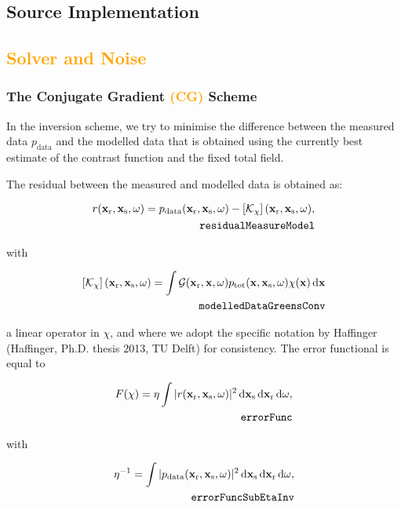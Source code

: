 \documentclass[10pt,a4paper]{article}
\newcommand{\df}[1]{\, \ensuremath{\mbox{d}#1}}
\newcommand{\xs}{\mathbf{x}_\text{s}}
\newcommand{\xr}{\mathbf{x}_\text{r}}
\newcommand{\x}{\mathbf{x}}
\begin{document}
\subsection{Source Implementation}

\subsection{\textcolor{orange}{Solver and Noise}}
\subsubsection{The Conjugate Gradient \textcolor{orange}{(CG)} Scheme}
\label{conjgrad}
In the inversion scheme, we try to minimise the difference between the
measured data $p_\text{data}$ and the modelled data that is obtained
using the currently best estimate of the contrast function and the
fixed total field.

The residual between the measured and modelled data is obtained as:

\begin{align} \label{eq:residualMeasureModel} r(\xr, \xs, \omega) =
p_{\text{data}}(\xr, \xs, \omega) - \left[\mathcal{K}_\chi
\right](\xr, \xs, \omega),\\
\tag*{\texttt{residualMeasureModel}}
\end{align}

with

\begin{align} \label{eq:modelledDataGreensConv} \left[\mathcal{K}_\chi \right](\xr,
\xs, \omega) = \int \mathcal{G}(\xr, \x, \omega) p_\text{tot}(\x, \xs,
\omega) \chi(\x) \df{\x}\\
\tag*{\texttt{modelledDataGreensConv}}
\end{align}

a linear operator in $\chi$, and where we adopt the specific notation
by Haffinger (Haffinger, Ph.D. thesis 2013, TU Delft) for consistency.
The error functional is equal to

\begin{align} \label{eq:errorFunc} F(\chi) = \eta \int |r(\xr, \xs,
\omega)|^2 \df{\mathbf{x}_\text{s}} \df{\xr}
\df{\omega},\\
\tag*{\texttt{errorFunc}}
\end{align}

with

\begin{align} \label{eq:errorFuncSubEtaInv} \eta^{-1} = \int | p_\text{data}(\xr,
\xs, \omega) |^2 \df{\xs} \df{\xr} \df{\omega}, \\
\tag*{\texttt{errorFuncSubEtaInv}} 
 \end{align}
\end{document}
